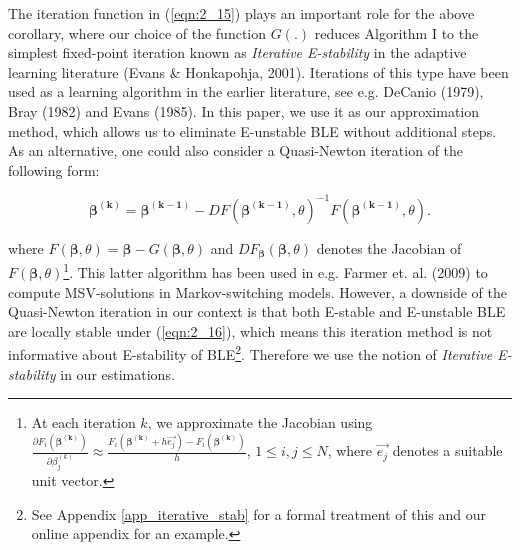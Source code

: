 The iteration function in (\ref{eqn:2_15}) plays an important role for the above corollary, where our choice of the function $G(.)$ reduces Algorithm I to the simplest fixed-point iteration known as \textit{Iterative E-stability} in the adaptive learning literature (Evans \& Honkapohja, 2001). Iterations of this type have been used as a learning algorithm in the earlier literature, see e.g. DeCanio (1979), Bray (1982) and Evans (1985). In this paper, we use it as our approximation method, which allows us to eliminate E-unstable BLE without additional steps. As an alternative, one could also  consider a Quasi-Newton iteration of the following form: 

\begin{equation}
\pmb{\beta^{(k)}} = \pmb{\beta^{(k-1)}} - DF(\pmb{ \beta^{(k-1)}},\theta)^{-1}F(\pmb{ \beta^{(k-1)}},\theta).
\label{eqn:2_16}
\end{equation}

\noindent
where $ F(\pmb{\beta},\theta) = \pmb{\beta}- G(\pmb{\beta},\theta) $  and $ DF_{\pmb{\beta}}(\pmb{ \beta},\theta) $ denotes the Jacobian of $ F(\pmb{\beta},\theta)$\footnote{ At each iteration $k$, we approximate the Jacobian using $\frac{\partial F_i(\pmb{\beta^{(k)}})}{\partial \beta_j^{(k)}}\approx \frac{F_i(\pmb{ \beta^{(k)}}+ h \vec{e_j})-F_i(\pmb{ \beta^{(k)}}) }{h}$, $  1 \leq   i,j \leq N  $, where $\vec{e_j}$ denotes a suitable unit vector.}. This latter algorithm has been used in e.g. Farmer et. al. (2009) to compute MSV-solutions in Markov-switching models. However, a downside of the Quasi-Newton iteration in our context is that both E-stable and E-unstable BLE are locally stable under (\ref{eqn:2_16}), which means this iteration method is not informative about E-stability of BLE\footnote{See Appendix \ref{app_iterative_stab} for a formal treatment of this and our online appendix for an example.}. Therefore we use the notion of \textit{Iterative E-stability} in our estimations.  \\


